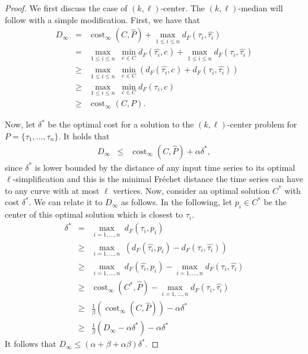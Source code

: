 \documentclass[11pt, letter]{article}
\DeclareMathOperator{\cost}{cost}
\newcommand{\Frechet}{Fr\'echet\xspace}
\providecommand{\pth}[2][\!]{#1\left({#2}\right)}
\newcommand{\nrClusters}{\ensuremath{k}}
\newcommand{\lenClusters}{\ensuremath{\ell}}
\newcommand{\constA}{\ensuremath{\alpha}}
\newcommand{\constB}{\ensuremath{\beta}}
\newcommand{\initialCost}{\ensuremath{D}}
\newcommand{\costOpt}{\ensuremath{\delta^{*}}}
\newcommand{\trajectory}[2]{\ensuremath{{#1}_{#2}}}
\newcommand{\trajectorySimp}[2]{\ensuremath{\widehat{{#1}_{#2}}}}
\newcommand{\inputSym}{\ensuremath{\tau}}
\newcommand{\centerSym}{\ensuremath{c}}
\newcommand{\inputTraj}[1]{\trajectory{\inputSym}{#1}}
\newcommand{\inputTrajSimp}[1]{\trajectorySimp{\inputSym}{#1}}
\newcommand{\centerTraj}[1]{\trajectory{\centerSym}{#1}}
\newcommand{\distFr}[2]{\ensuremath{d_F\pth{#1,#2}}}
\begin{document}
\begin{proof}
We first discuss the case of $(\nrClusters,\lenClusters)$-center. The
$(\nrClusters,\lenClusters)$-median will follow with a simple modification.
First, we have that 
\begin{eqnarray*}
\initialCost_{\infty} 
&=& \cost_{\infty}(C,\widehat{P})+ \max_{1\leq i\leq n} \distFr{\inputTraj{i}}{\inputTrajSimp{i}} \\
&=& \max_{1\leq i\leq n}\; \min_{\centerTraj{} \in C}
\distFr{\inputTrajSimp{i}}{\centerTraj{}} + \max_{1\leq i\leq n} \distFr{\inputTraj{i}}{\inputTrajSimp{i}} \\
&\geq& \max_{1\leq i\leq n}\; \min_{\centerTraj{} \in C}
\pth{\distFr{\inputTrajSimp{i}}{\centerTraj{}} +
\distFr{\inputTraj{i}}{\inputTrajSimp{i}}} \\
&\geq& \max_{1\leq i\leq n}\; \min_{\centerTraj{} \in C}
\distFr{\inputTraj{i}}{\centerTraj{}} \\
&\geq& \cost_{\infty}(C,P).
\end{eqnarray*}

Now, let $\costOpt$ be the optimal cost for a solution to the $(\nrClusters,\lenClusters)$-center problem
 for $P=\{\inputTraj{1},\dots,\inputTraj{n}\}$.
It holds that 
\begin{eqnarray*}
\initialCost_{\infty} &\leq& \cost_{\infty}(C,\widehat{P})  + \constA \costOpt, 
\end{eqnarray*}
since $\costOpt$ is lower bounded by the distance of any input time series to its optimal
$\lenClusters$-simplification and this is the minimal \Frechet distance the time series can have to any curve
with at most $\lenClusters$ vertices. 
Now, consider an optimal solution $C^{*}$ with cost $\costOpt$. We can relate it to
$\initialCost_{\infty}$ as follows. In the following, let $p_i \in C^{*}$ be the center of this
optimal solution which is closest to $\inputTraj{i}$.
\begin{eqnarray*}
\costOpt &=& \max_{i=1,\ldots, n}\; \distFr{\inputTraj{i}}{p_i}\\
 &\geq& \max_{i=1,\ldots, n}\; \pth{\distFr{\inputTrajSimp{i}}{p_i} - \distFr{\inputTraj{i}}{\inputTrajSimp{i}}}\\
&\geq& \max_{i=1,\ldots, n}\; \distFr{\inputTrajSimp{i}}{p_i}
- \max_{i=1,\ldots, n} \distFr{\inputTraj{i}}{\inputTrajSimp{i}}\\
&\geq& \cost_{\infty}(C^{*},\widehat{P}) 
- \max_{i=1,\ldots, n} \distFr{\inputTraj{i}}{\inputTrajSimp{i}}\\
&\geq&  \frac{1}{\constB}\pth{ \cost_{\infty}(C,\widehat{P})} - \constA \costOpt\\
&\geq&  \frac{1}{\constB}\pth{ \initialCost_{\infty} - \constA \costOpt} - \constA \costOpt
\end{eqnarray*}
It follows that $\initialCost_{\infty} \leq (\constA+\constB+\constA\constB)\costOpt$. 

\end{proof}
\end{document}
